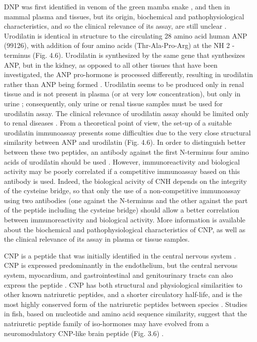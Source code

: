 \documentclass[14pt,a4paper,onecolumn]{extarticle}
\begin{document}
DNP was first identified in venom of the green mamba snake \citep{bib2103}, and then in
mammal plasma and tissues, but its origin, biochemical and pathophysiological characteristics, and so the clinical relevance of its assay, are still unclear \citep{bib2102} \citep{bib2104}.
Urodilatin is identical in structure to the circulating 28 amino acid human ANP (99126), with addition of four amino acids (Thr-Ala-Pro-Arg) at the NH 2 -terminus (Fig. 4.6).
Urodilatin is synthesized by the same gene that synthesizes ANP, but in the kidney, as
opposed to all other tissues that have been investigated, the ANP pro-hormone is processed
differently, resulting in urodilatin rather than ANP being formed \citep{bib2100} \citep{bib2101} \citep{bib2102}. Urodilatin
seems to be produced only in renal tissue and is not present in plasma (or at very low
concentration), but only in urine \citep{bib2100} \citep{bib2101} \citep{bib2102}; consequently, only urine or renal tissue samples must be used for urodilatin assay. The clinical relevance of urodilatin assay should be
limited only to renal diseases \citep{bib2102}. From a theoretical point of view, the set-up of a suitable urodilatin immunoassay presents some difficulties due to the very close structural
similarity between ANP and urodilatin (Fig. 4.6). In order to distinguish better between
these two peptides, an antibody against the first N-terminus four amino acids of urodilatin should be used \citep{bib2100}. However, immunoreactivity and biological activity may be
poorly correlated if a competitive immunoassay based on this antibody is used. Indeed,
the biological acivity of CNH depends on the integrity of the cysteine bridge, so that only
the use of a non-competitive immunoassay using two antibodies (one against the N-terminus and the other against the part of the peptide including the cysteine bridge) should
allow a better correlation between immunoreactivity and biological activity.
More information is available about the biochemical and pathophysiological characteristics of CNP, as well as the clinical relevance of its assay in plasma or tissue
samples.

CNP is a peptide that was initially identified in the central nervous system \citep{bib2105}.
CNP is expressed predominantly in the endothelium, but the central nervous system,
myocardium, and gastrointestinal and genitourinary tracts can also express the peptide
\citep{bib2106} \citep{bib2107}. CNP has both structural and physiological similarities to other known natriuretic peptides, and a shorter circulatory half-life, and is the most highly conserved
form of the natriuretic peptides between species \citep{bib2106} \citep{bib2107} \citep{bib2108} \citep{bib2109} \citep{bib2110}. Studies in fish, based on
nucleotide and amino acid sequence similarity, suggest that the natriuretic peptide
family of iso-hormones may have evolved from a neuromodulatory CNP-like brain peptide (Fig. 3.6) \citep{bib2109} \citep{bib2110}.
\end{document}
